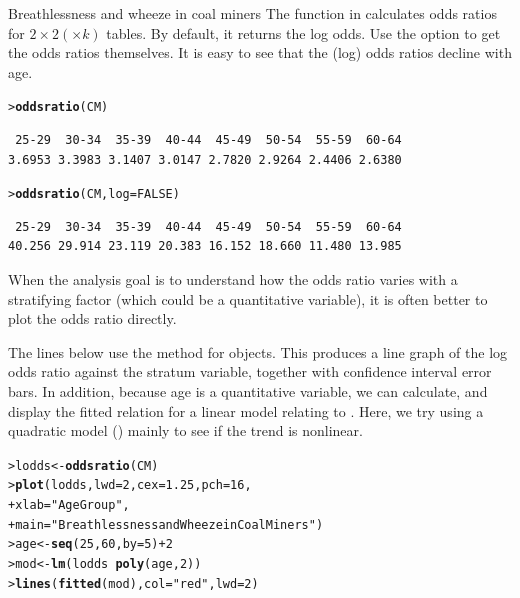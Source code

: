 \documentclass[10pt,krantz2]{krantz}\usepackage[]{graphicx}\usepackage[]{color}
\makeatletter
\newcommand{\hlnum}[1]{\textcolor[rgb]{0.686,0.059,0.569}{#1}}%
\newcommand{\hlstr}[1]{\textcolor[rgb]{0.192,0.494,0.8}{#1}}%
\newcommand{\hlopt}[1]{\textcolor[rgb]{0,0,0}{#1}}%
\newcommand{\hlstd}[1]{\textcolor[rgb]{0.345,0.345,0.345}{#1}}%
\newcommand{\hlkwb}[1]{\textcolor[rgb]{0.69,0.353,0.396}{#1}}%
\newcommand{\hlkwc}[1]{\textcolor[rgb]{0.333,0.667,0.333}{#1}}%
\newcommand{\hlkwd}[1]{\textcolor[rgb]{0.737,0.353,0.396}{\textbf{#1}}}%
\newenvironment{kframe}{%
 \def\at@end@of@kframe{}%
 \ifinner\ifhmode%
  \def\at@end@of@kframe{\end{minipage}}%
  \begin{minipage}{\columnwidth}%
 \fi\fi%
 \def\FrameCommand##1{\hskip\@totalleftmargin \hskip-\fboxsep
 \colorbox{shadecolor}{##1}\hskip-\fboxsep
     \hskip-\linewidth \hskip-\@totalleftmargin \hskip\columnwidth}%
 \MakeFramed {\advance\hsize-\width
   \@totalleftmargin\z@ \linewidth\hsize
   \@setminipage}}%
 {\par\unskip\endMakeFramed%
 \at@end@of@kframe}
\newenvironment{knitrout}{}{} %
\renewenvironment{knitrout}{\small\renewcommand{\baselinestretch}{.85}}{} %
\makeatother
\begin{document}
\begin{Example}[wheeze1]{Breathlessness and wheeze in coal miners}
The  function in  calculates odds ratios
for $2 \times 2 (\times k)$ tables.  By default, it returns the
log odds.  Use the option  to get the odds ratios
themselves.  It is easy to see that the (log) odds ratios decline
with age.
\begin{knitrout}
\color{fgcolor}\begin{kframe}
\begin{alltt}
\hlstd{> }\hlkwd{oddsratio}\hlstd{(CM)}
\end{alltt}
\begin{verbatim}
 25-29  30-34  35-39  40-44  45-49  50-54  55-59  60-64 
3.6953 3.3983 3.1407 3.0147 2.7820 2.9264 2.4406 2.6380 
\end{verbatim}
\begin{alltt}
\hlstd{> }\hlkwd{oddsratio}\hlstd{(CM,} \hlkwc{log} \hlstd{=} \hlnum{FALSE}\hlstd{)}
\end{alltt}
\begin{verbatim}
 25-29  30-34  35-39  40-44  45-49  50-54  55-59  60-64 
40.256 29.914 23.119 20.383 16.152 18.660 11.480 13.985 
\end{verbatim}
\end{kframe}
\end{knitrout}
When the analysis goal is to understand how the odds ratio varies
with a stratifying factor (which could be a quantitative variable),
it is often better to plot the odds ratio directly.

The lines below
use the  method for  objects.
This produces a line graph of the log odds ratio against the
stratum variable, together with confidence interval error bars.
In addition, because age is a quantitative variable, we can
calculate, and display the fitted relation for a linear model
relating  to .  Here, we try using a
quadratic model () mainly to see if the
trend is nonlinear.
\begin{knitrout}
\color{fgcolor}\begin{kframe}
\begin{alltt}
\hlstd{> }\hlstd{lodds} \hlkwb{<-} \hlkwd{oddsratio}\hlstd{(CM)}
\hlstd{> }\hlkwd{plot}\hlstd{(lodds,} \hlkwc{lwd} \hlstd{=} \hlnum{2}\hlstd{,} \hlkwc{cex} \hlstd{=} \hlnum{1.25}\hlstd{,} \hlkwc{pch} \hlstd{=} \hlnum{16}\hlstd{,}
\hlstd{+ }     \hlkwc{xlab} \hlstd{=} \hlstr{"Age Group"}\hlstd{,}
\hlstd{+ }     \hlkwc{main} \hlstd{=} \hlstr{"Breathlessness and Wheeze in Coal Miners"}\hlstd{)}
\hlstd{> }\hlstd{age} \hlkwb{<-} \hlkwd{seq}\hlstd{(}\hlnum{25}\hlstd{,} \hlnum{60}\hlstd{,} \hlkwc{by} \hlstd{=} \hlnum{5}\hlstd{)} \hlopt{+} \hlnum{2}
\hlstd{> }\hlstd{mod} \hlkwb{<-} \hlkwd{lm}\hlstd{(lodds} \hlopt{~} \hlkwd{poly}\hlstd{(age,} \hlnum{2}\hlstd{))}
\hlstd{> }\hlkwd{lines}\hlstd{(}\hlkwd{fitted}\hlstd{(mod),} \hlkwc{col} \hlstd{=} \hlstr{"red"}\hlstd{,} \hlkwc{lwd} \hlstd{=} \hlnum{2}\hlstd{)}
\end{alltt}
\end{kframe}\begin{figure}[!htbp]


\end{figure}
\end{knitrout}
\end{Example}
\end{document}

